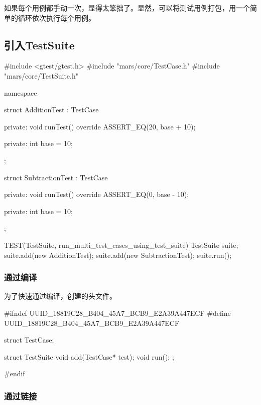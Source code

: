 \begin{content}

如果每个用例都手动一次，显得太笨拙了。显然，可以将测试用例打包，用一个简单的循环依次执行每个用例。

\subsection{引入TestSuite}

\begin{leftbar}
 \begin{c++}[caption={\ttfamily{test/mars/core/TestSuiteSpec.cc}}]
#include <gtest/gtest.h>
#include "mars/core/TestCase.h"
#include "mars/core/TestSuite.h"

namespace {
  struct AdditionTest : TestCase {
  private:
    void runTest() override {
      ASSERT_EQ(20, base + 10);
    }

  private:
    int base = 10;
  };

  struct SubtractionTest : TestCase {
  private:
    void runTest() override {
      ASSERT_EQ(0, base - 10);
    }

  private:
    int base = 10;
  };
}

TEST(TestSuite, run_multi_test_cases_using_test_suite) {
  TestSuite suite;
  suite.add(new AdditionTest);
  suite.add(new SubtractionTest);
  suite.run();
}
 \end{c++}
\end{leftbar}

\subsubsection{通过编译}

为了快速通过编译，创建的头文件。

\begin{leftbar}
 \begin{c++}[caption={\ttfamily{include/mars/core/TestSuite.h}}]
#ifndef UUID_18819C28_B404_45A7_BCB9_E2A39A447ECF
#define UUID_18819C28_B404_45A7_BCB9_E2A39A447ECF

struct TestCase;

struct TestSuite {
  void add(TestCase* test);
  void run();
};

#endif
 \end{c++}
\end{leftbar}

\subsubsection{通过链接}


\end{content}
